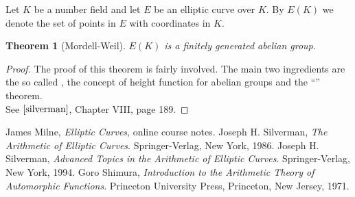 \documentclass[12pt]{article}
\newtheorem{thm}{Theorem}
\begin{document}
Let $K$ be a number field and let $E$ be an elliptic curve over
$K$. By $E(K)$ we denote the set of points in $E$ with coordinates
in $K$.

\begin{thm}[Mordell-Weil]$E(K)$ is a finitely generated abelian
group.
\end{thm}
\begin{proof}
The proof of this theorem is fairly involved. The
main two ingredients are the so called , the concept of height function for abelian groups and
the ``'' theorem. \\See $\cite{silverman}$, Chapter VIII, page
189.
\end{proof}

\begin{thebibliography}{9}
 James Milne, {\em Elliptic Curves}, online course notes. 
 Joseph H. Silverman, {\em The Arithmetic of Elliptic Curves}. Springer-Verlag, New York, 1986.
 Joseph H. Silverman, {\em Advanced Topics in
the Arithmetic of Elliptic Curves}. Springer-Verlag, New York,
1994.
 Goro Shimura, {\em Introduction to the
Arithmetic Theory of Automorphic Functions}. Princeton University
Press, Princeton, New Jersey, 1971.
\end{thebibliography}
\end{document}
